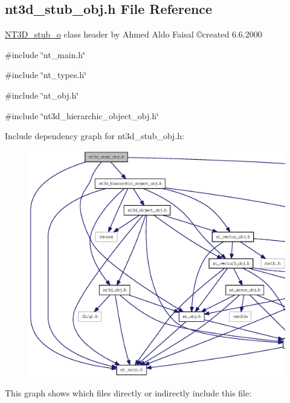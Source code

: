 \subsection{nt3d\_\-stub\_\-obj.h File Reference}
\label{nt3d__stub__obj_8h}



\begin{DoxyItemize}
\item \hyperlink{class_n_t3_d__stub__o}{NT3D\_\-stub\_\-o} class header by Ahmed Aldo Faisal \copyright created 6.6.2000 
\end{DoxyItemize} 


{\ttfamily \#include \char`\"{}nt\_\-main.h\char`\"{}}\par
{\ttfamily \#include \char`\"{}nt\_\-types.h\char`\"{}}\par
{\ttfamily \#include \char`\"{}nt\_\-obj.h\char`\"{}}\par
{\ttfamily \#include \char`\"{}nt3d\_\-hierarchic\_\-object\_\-obj.h\char`\"{}}\par
Include dependency graph for nt3d\_\-stub\_\-obj.h:
\nopagebreak
\begin{figure}[H]
\begin{center}
\leavevmode
\includegraphics[width=400pt]{nt3d__stub__obj_8h__incl}
\end{center}
\end{figure}
This graph shows which files directly or indirectly include this file:
